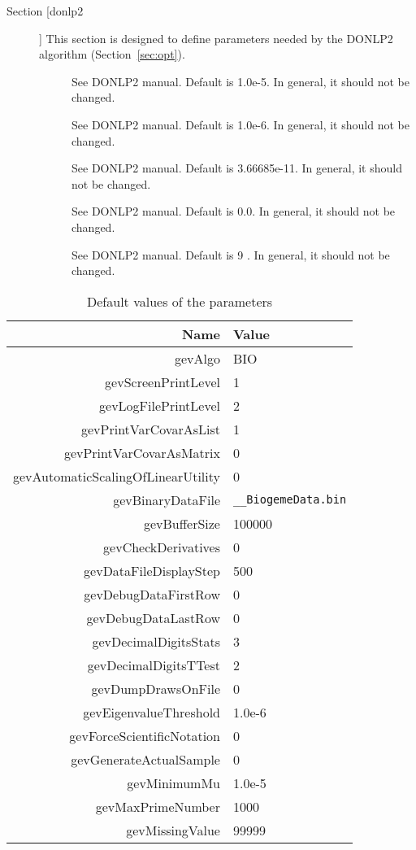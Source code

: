 \documentclass[12pt]{memoir}
\begin{document}
\begin{description}
  \item[Section [donlp2]]
   This section is designed to define parameters needed by the
   DONLP2 algorithm (Section~\ref{sec:opt}).  
   \begin{description}
      \item[] See DONLP2 manual. Default is 1.0e-5. In
         general, it should not be changed.
      \item[] See DONLP2 manual. Default is 1.0e-6. In
         general, it should not be changed.
      \item[] See DONLP2 manual. Default is 3.66685e-11. In
         general, it should not be changed.
      \item[] See DONLP2 manual. Default is 0.0. In general,
         it should not be changed.
      \item[] See DONLP2 manual. Default is 9 . In general,
         it should not be changed.
   \end{description}

\end{description}

\begin{table}
\begin{center}
\begin{tabular}{rl}
Name & Value \\
\hline
gevAlgo & BIO \\
gevScreenPrintLevel & 1 \\
gevLogFilePrintLevel & 2 \\
gevPrintVarCovarAsList & 1 \\
gevPrintVarCovarAsMatrix & 0 \\

\hline
gevAutomaticScalingOfLinearUtility & 0 \\
gevBinaryDataFile &\texttt{\_\_BiogemeData.bin} \\
gevBufferSize & 100000 \\ 
gevCheckDerivatives & 0 \\
gevDataFileDisplayStep & 500 \\
gevDebugDataFirstRow & 0 \\
gevDebugDataLastRow & 0 \\
gevDecimalDigitsStats & 3 \\
gevDecimalDigitsTTest & 2 \\
gevDumpDrawsOnFile & 0 \\
gevEigenvalueThreshold & 1.0e-6 \\
gevForceScientificNotation & 0 \\
gevGenerateActualSample & 0 \\
gevMinimumMu & 1.0e-5 \\
gevMaxPrimeNumber & 1000 \\
gevMissingValue & 99999 \\
\end{tabular}
\end{center}
\caption{Default values of the parameters}
\end{table}
\end{document}
